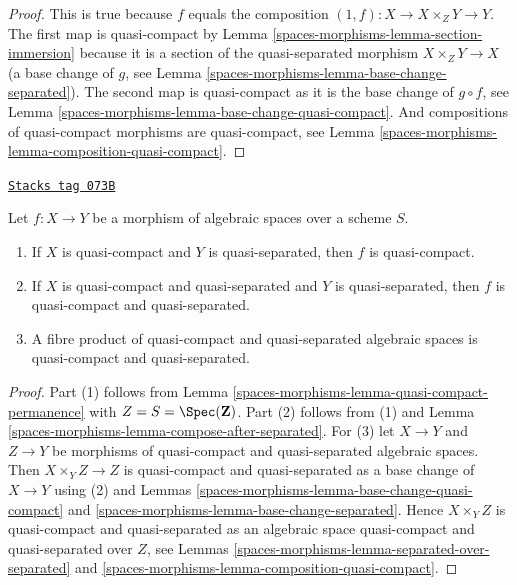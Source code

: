 \begin{proof}
This is true because $f$ equals the composition
$(1, f) : X \to X \times_Z Y \to Y$. The first map
is quasi-compact by Lemma \ref{spaces-morphisms-lemma-section-immersion}
because it is a section of the quasi-separated morphism $X \times_Z Y \to X$
(a base change of $g$, see Lemma \ref{spaces-morphisms-lemma-base-change-separated}).
The second map is quasi-compact as it
is the base change of $g \circ f$, see
Lemma \ref{spaces-morphisms-lemma-base-change-quasi-compact}.
And compositions of quasi-compact
morphisms are quasi-compact, see Lemma \ref{spaces-morphisms-lemma-composition-quasi-compact}.
\end{proof}

\begin{lemma}
\label{spaces-morphisms-lemma-quasi-compact-quasi-separated-permanence}
\href{https://stacks.math.columbia.edu/tag/073B}{\texttt{Stacks tag 073B}}

Let $f : X \to Y$ be a morphism of algebraic spaces
over a scheme $S$.
\begin{enumerate}
\item If $X$ is quasi-compact and $Y$ is quasi-separated, then $f$ is
quasi-compact.
\item If $X$ is quasi-compact and quasi-separated and $Y$ is quasi-separated,
then $f$ is quasi-compact and quasi-separated.
\item A fibre product of quasi-compact and quasi-separated algebraic spaces
is quasi-compact and quasi-separated.
\end{enumerate}
\end{lemma}

\begin{proof}
Part (1) follows from
Lemma \ref{spaces-morphisms-lemma-quasi-compact-permanence}
with $Z = S = \Spec(\mathbf{Z})$.
Part (2) follows from (1) and
Lemma \ref{spaces-morphisms-lemma-compose-after-separated}.
For (3) let $X \to Y$ and $Z \to Y$ be morphisms
of quasi-compact and quasi-separated algebraic spaces. Then
$X \times_Y Z \to Z$ is quasi-compact and quasi-separated as a
base change of $X \to Y$ using (2) and
Lemmas \ref{spaces-morphisms-lemma-base-change-quasi-compact} and
\ref{spaces-morphisms-lemma-base-change-separated}.
Hence $X \times_Y Z$ is quasi-compact and quasi-separated as
an algebraic space quasi-compact and quasi-separated over
$Z$, see
Lemmas \ref{spaces-morphisms-lemma-separated-over-separated} and
\ref{spaces-morphisms-lemma-composition-quasi-compact}.
\end{proof}

